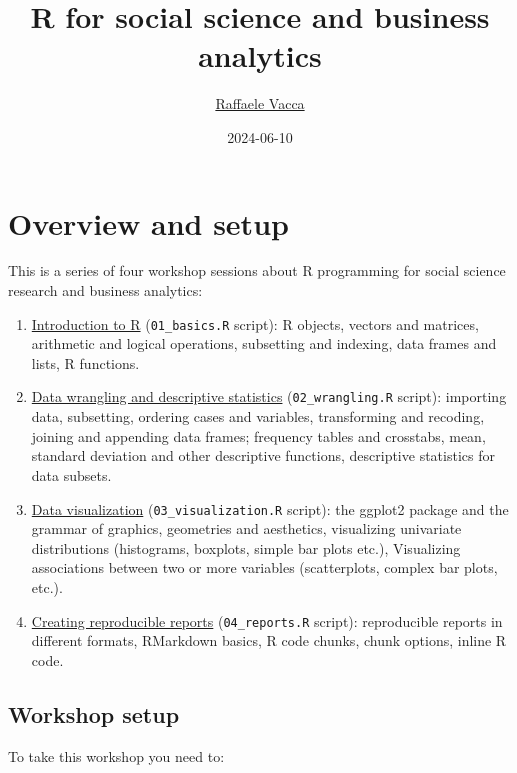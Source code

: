 \documentclass[
]{book}
\title{R for social science and business analytics}
\author{\href{http://www.raffaelevacca.com/}{Raffaele Vacca}}
\date{2024-06-10}
\providecommand{\tightlist}{%
  \setlength{\itemsep}{0pt}\setlength{\parskip}{0pt}}
\begin{document}
\maketitle

{
\setcounter{tocdepth}{1}
\tableofcontents
}
\hypertarget{overview-and-setup}{%
\chapter{Overview and setup}\label{overview-and-setup}}

This is a series of four workshop sessions about R programming for social science research and business analytics:

\begin{enumerate}
\def\labelenumi{\arabic{enumi}.}
\tightlist
\item
  \protect\hyperlink{intro}{Introduction to R} (\texttt{01\_basics.R} script): R objects, vectors and matrices, arithmetic and logical operations, subsetting and indexing, data frames and lists, R functions.
\item
  \protect\hyperlink{wrangling}{Data wrangling and descriptive statistics} (\texttt{02\_wrangling.R} script): importing data, subsetting, ordering cases and variables, transforming and recoding, joining and appending data frames; frequency tables and crosstabs, mean, standard deviation and other descriptive functions, descriptive statistics for data subsets.
\item
  \protect\hyperlink{visualization}{Data visualization} (\texttt{03\_visualization.R} script): the ggplot2 package and the grammar of graphics, geometries and aesthetics, visualizing univariate distributions (histograms, boxplots, simple bar plots etc.), Visualizing associations between two or more variables (scatterplots, complex bar plots, etc.).
\item
  \protect\hyperlink{reproducible}{Creating reproducible reports} (\texttt{04\_reports.R} script): reproducible reports in different formats, RMarkdown basics, R code chunks, chunk options, inline R code.
\end{enumerate}

\hypertarget{setup}{%
\section{Workshop setup}\label{setup}}

To take this workshop you need to:
\end{document}

